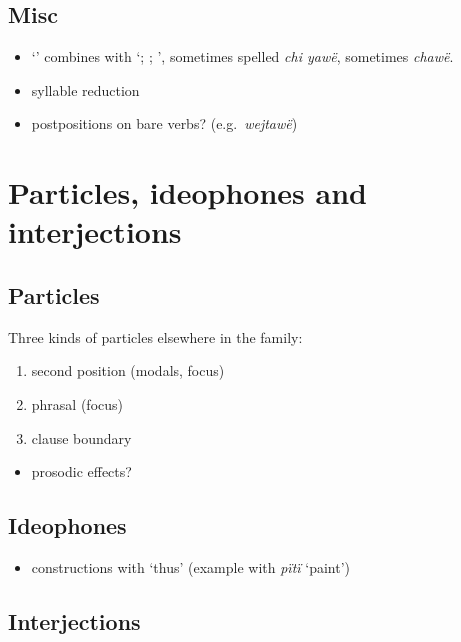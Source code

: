 \documentclass{memoir}
\begin{document}
\section{Misc}

\begin{itemize}
\tightlist
\item
   `' combines with  `; ;
  ', sometimes spelled \emph{chi yawë}, sometimes \emph{chawë}.
\item
  syllable reduction
\item
  postpositions on bare verbs? (e.g.~\emph{wejtawë})
\end{itemize}

\chapter{\texorpdfstring{Particles, ideophones and interjections
\label{partideo}}{Particles, ideophones and interjections }}

\section{Particles}

Three kinds of particles elsewhere in the family:

\begin{enumerate}
\def\labelenumi{\arabic{enumi}.}
\tightlist
\item
  second position (modals, focus)
\item
  phrasal (focus)
\item
  clause boundary
\end{enumerate}

\begin{itemize}
\tightlist
\item
  prosodic effects?
\end{itemize}

\section{Ideophones}

\begin{itemize}
\tightlist
\item
  constructions with  `thus' (example with \emph{pïtï}
  `paint')
\end{itemize}

\section{Interjections}
\end{document}
